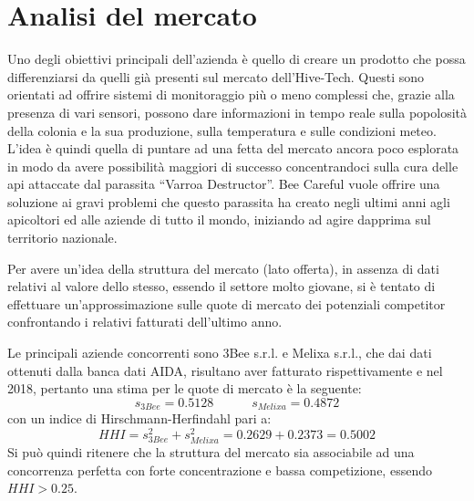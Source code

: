 \section{Analisi del mercato}
Uno degli obiettivi principali dell'azienda è quello di creare un prodotto che
possa differenziarsi da quelli già presenti sul mercato dell'Hive-Tech.
Questi sono orientati ad offrire sistemi di monitoraggio più o meno complessi
che, grazie alla presenza di vari sensori, possono dare informazioni in tempo
reale sulla popolosità della colonia e la sua produzione, sulla temperatura e
sulle condizioni meteo. L’idea è quindi quella di puntare ad una fetta del
mercato ancora poco esplorata in modo da avere possibilità maggiori di successo
concentrandoci sulla cura delle api attaccate dal parassita ``Varroa
Destructor''.
Bee Careful vuole offrire una soluzione ai gravi problemi che questo parassita
ha creato negli ultimi anni agli apicoltori ed alle aziende di tutto il mondo,
iniziando ad agire dapprima sul territorio nazionale.

Per avere un’idea della struttura del mercato (lato offerta), in assenza di dati
relativi al valore dello stesso, essendo il settore molto giovane, si è tentato
di effettuare un’approssimazione sulle quote di mercato dei potenziali
competitor confrontando i relativi fatturati dell’ultimo anno.

Le principali aziende concorrenti sono 3Bee s.r.l. e Melixa s.r.l., che dai dati
ottenuti dalla banca dati AIDA\cite{aida}, risultano aver fatturato
rispettivamente   e  nel 2018, pertanto una stima per le
quote di mercato è la seguente:
\begin{displaymath}
	s_{3Bee} = 0.5128   \qquad \quad s_{Melixa} = 0.4872
\end{displaymath}
con un indice di Hirschmann-Herfindahl pari a:
\begin{displaymath}
	HHI = s^2_{3Bee} + s^2_{Melixa} = 0.2629 + 0.2373 = 0.5002
\end{displaymath}
Si può quindi ritenere che la struttura del mercato sia associabile ad una
concorrenza perfetta con forte concentrazione e bassa competizione, essendo $HHI
> 0.25$.
